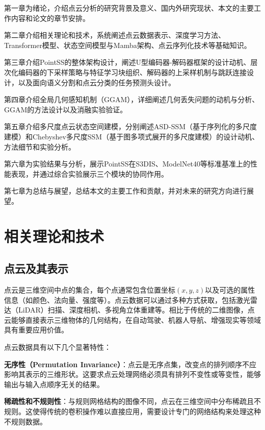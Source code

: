 \documentclass[12pt,a4paper,openany,oneside]{ctexbook}
\theoremstyle{definition}
\theoremstyle{remark}
\begin{document}
第一章为绪论，介绍点云分析的研究背景及意义、国内外研究现状、本文的主要工作内容和论文的章节安排。

第二章介绍相关理论和技术，系统阐述点云数据表示、深度学习方法、Transformer模型、状态空间模型与Mamba架构、点云序列化技术等基础知识。

第三章介绍PointSS的整体架构设计，阐述U型编码器-解码器框架的设计动机、层次化编码器的下采样策略与特征学习块组织、解码器的上采样机制与跳跃连接设计，以及面向语义分割和点云分类的任务预测头设计。

第四章介绍全局几何感知机制（GGAM），详细阐述几何丢失问题的动机与分析、GGAM的方法设计以及消融实验验证。

第五章介绍多尺度点云状态空间建模，分别阐述ASD-SSM（基于序列化的多尺度建模）和Chebyshev多尺度SSM（基于图多项式展开的多尺度建模）的设计动机、方法细节和实验分析。

第六章为实验结果与分析，展示PointSS在S3DIS、ModelNet40等标准基准上的性能表现，并通过综合实验展示三个模块的协同作用。

第七章为总结与展望，总结本文的主要工作和贡献，并对未来的研究方向进行展望。






\chapter{相关理论和技术}


\section{点云及其表示}

点云是三维空间中点的集合，每个点通常包含位置坐标$(x, y, z)$以及可选的属性信息（如颜色、法向量、强度等）。点云数据可以通过多种方式获取，包括激光雷达（LiDAR）扫描、深度相机、多视角立体重建等。相比于传统的二维图像，点云能够直接表示三维物体的几何结构，在自动驾驶\cite{qi2018frustum}、机器人导航\cite{rusu20113d}、增强现实\cite{izadi2011kinectfusion}等领域具有重要应用价值。

点云数据具有以下几个显著特性：

\textbf{无序性（Permutation Invariance）}：点云是无序点集，改变点的排列顺序不应影响其表示的三维形状。这要求点云处理网络必须具有排列不变性或等变性，能够输出与输入点顺序无关的结果。

\textbf{稀疏性和不规则性}：与规则网格结构的图像不同，点云在三维空间中分布稀疏且不规则。这使得传统的卷积操作难以直接应用，需要设计专门的网络结构来处理这种不规则数据。
\end{document}
